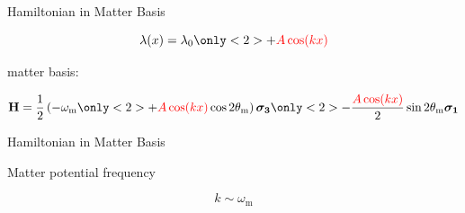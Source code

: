 \documentclass[9pt]{beamer}
\begin{document}
\begin{darkframes}
\begin{frame}{Hamiltonian in Matter Basis}
\begin{textblock*}{10pt}
\end{textblock*}


\begin{tcolorbox}[title=Matter Potential]
\begin{equation*}
    \lambda(x)  = \lambda_0 \only<2>{ + {\color{red}A\cos(k x)} }
\end{equation*}
\end{tcolorbox}




\begin{tcolorbox}[title=Basis]

 matter basis:


\begin{equation*}
    \mathbf H = \frac{1}{2}\left( - \omega_{\mathrm{m}}
    \only<2>{
    + {\color{red}A\cos(kx)} \cos 2\theta_{\mathrm{m}}
    }
    \right) \boldsymbol{\sigma_3}
    \only<2>{
    - \frac{{\color{red}A\cos(kx) } }{2} \sin 2\theta_{\mathrm{m}} \boldsymbol{\sigma_1}
    }
\end{equation*}


\end{tcolorbox}






\end{frame}






\begin{frame}{Hamiltonian in Matter Basis}




Matter potential frequency

\begin{equation*}
    k\sim \omega_{\mathrm m}
\end{equation*}



\end{frame}
\end{darkframes}
\end{document}
